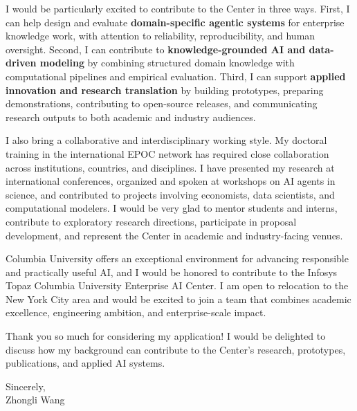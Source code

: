 \documentclass[11pt]{article}
\begin{document}
I would be particularly excited to contribute to the Center in three ways. First, I can help design and evaluate \textbf{domain-specific agentic systems} for enterprise knowledge work, with attention to reliability, reproducibility, and human oversight. Second, I can contribute to \textbf{knowledge-grounded AI and data-driven modeling} by combining structured domain knowledge with computational pipelines and empirical evaluation. Third, I can support \textbf{applied innovation and research translation} by building prototypes, preparing demonstrations, contributing to open-source releases, and communicating research outputs to both academic and industry audiences.

I also bring a collaborative and interdisciplinary working style. My doctoral training in the international EPOC network has required close collaboration across institutions, countries, and disciplines. I have presented my research at international conferences, organized and spoken at workshops on AI agents in science, and contributed to projects involving economists, data scientists, and computational modelers. I would be very glad to mentor students and interns, contribute to exploratory research directions, participate in proposal development, and represent the Center in academic and industry-facing venues.

Columbia University offers an exceptional environment for advancing responsible and practically useful AI, and I would be honored to contribute to the Infosys Topaz Columbia University Enterprise AI Center. I am open to relocation to the New York City area and would be excited to join a team that combines academic excellence, engineering ambition, and enterprise-scale impact.

Thank you so much for considering my application! I would be delighted to discuss how my background can contribute to the Center's research, prototypes, publications, and applied AI systems.

\vspace{0.35cm}

\noindent Sincerely,\\[0.95cm]
\noindent Zhongli Wang
\end{document}

